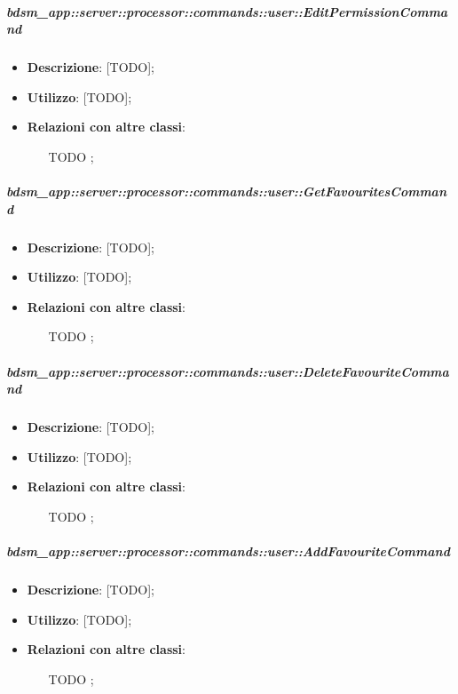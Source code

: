        \subparagraph{bdsm\_app::server::processor::commands::user::EditPermissionCommand} %
        \label{subp:bdsm_app_server_processor_commands_user_editpermissioncommand}
        \begin{itemize}
          \item \textbf{Descrizione}: [TODO];
          \item \textbf{Utilizzo}: [TODO];
          \item \textbf{Relazioni con altre classi}:
            \begin{itemize}
              \item [TODO];
            \end{itemize}
        \end{itemize}

        \subparagraph{bdsm\_app::server::processor::commands::user::GetFavouritesCommand} %
        \label{subp:bdsm_app_server_processor_commands_user_getfavouritescommand}
        \begin{itemize}
          \item \textbf{Descrizione}: [TODO];
          \item \textbf{Utilizzo}: [TODO];
          \item \textbf{Relazioni con altre classi}:
            \begin{itemize}
              \item [TODO];
            \end{itemize}
        \end{itemize}

        \subparagraph{bdsm\_app::server::processor::commands::user::DeleteFavouriteCommand} %
        \label{subp:bdsm_app_server_processor_commands_user_deletefavouritecommand}
        \begin{itemize}
          \item \textbf{Descrizione}: [TODO];
          \item \textbf{Utilizzo}: [TODO];
          \item \textbf{Relazioni con altre classi}:
            \begin{itemize}
              \item [TODO];
            \end{itemize}
        \end{itemize}

        \subparagraph{bdsm\_app::server::processor::commands::user::AddFavouriteCommand} %
        \label{subp:bdsm_app_server_processor_commands_user_addfavouritecommand}
        \begin{itemize}
          \item \textbf{Descrizione}: [TODO];
          \item \textbf{Utilizzo}: [TODO];
          \item \textbf{Relazioni con altre classi}:
            \begin{itemize}
              \item [TODO];
            \end{itemize}
        \end{itemize}


